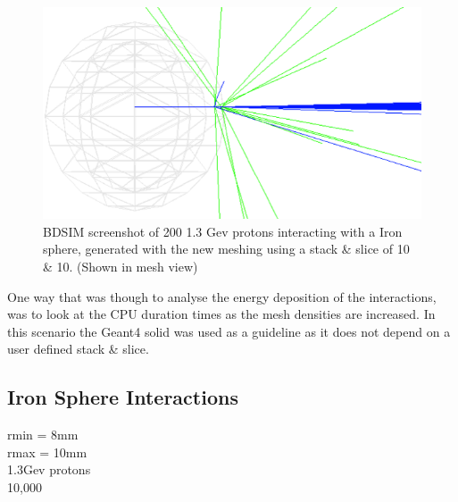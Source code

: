 \documentclass[12pt,a4paper]{article}
\begin{document}
\begin{figure}[h!]
\centering
\includegraphics[scale=1]{Images//BDSIM//ProtonSphere.png}
\caption[width=\columnwidth]{BDSIM screenshot of 200 1.3 Gev protons interacting with a Iron sphere, generated with the new meshing using a stack \& slice of 10 \& 10. (Shown in mesh view)}
\label{sphbd}
\end{figure}

\noindent One way that was though to analyse the energy deposition of the interactions, was to look at the CPU duration times as the mesh densities are increased. In this scenario the Geant4 solid was used as a guideline as it does not depend on a user defined stack \& slice. 

\subsection{Iron Sphere Interactions}
rmin = 8mm\\
rmax = 10mm\\
1.3Gev protons\\
10,000\\
\end{document}
